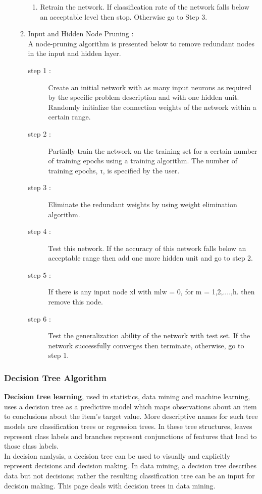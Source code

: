 \documentclass[a4paper,14pt,onecolumn]{article}
\begin{document}
\begin{enumerate}
\begin{enumerate}
\begin{enumerate}
          \item Retrain the network. If classification rate of the network falls   
    below an acceptable   level then  stop.
    Otherwise go to Step 3.

          \end{enumerate}
   \item Input and Hidden Node Pruning :\\A node-pruning algorithm is presented below to remove redundant nodes in the input and hidden layer.
          \begin{description}
          \item[step 1 :]Create an initial network with as many input neurons as required by the specific problem description and with one hidden unit. Randomly initialize the connection weights of the network within a certain range.
          \item[step 2 :]Partially train the network on the training set for a certain number of training epochs using a training algorithm. The number of training epochs, τ, is specified by the user.
          \item[step 3 :]Eliminate the redundant weights by using weight elimination algorithm.
          \item[step 4 :]Test this network. If the accuracy of this network falls below an acceptable range then add one more hidden unit and go to step 2.
          \item[step 5 :]If there is any input node xl with mlw = 0, for m = 1,2,....,h. then remove this node.
          \item[step 6 :]Test the generalization ability of the network with test set. If the network successfully converges then terminate, otherwise, go to step 1.

          \end{description}
   \end{enumerate}
\end{enumerate}

\subsubsection{Decision Tree Algorithm}
\textbf{Decision tree learning}, used in statistics, data mining and machine learning, uses a decision tree as a predictive model which maps observations about an item to conclusions about the item's target value. More descriptive names for such tree models are classification trees or regression trees. In these tree structures, leaves represent class labels and branches represent conjunctions of features that lead to those class labels.\\
In decision analysis, a decision tree can be used to visually and explicitly represent decisions and decision making. In data mining, a decision tree describes data but not decisions; rather the resulting classification tree can be an input for decision making. This page deals with decision trees in data mining.
\end{document}
